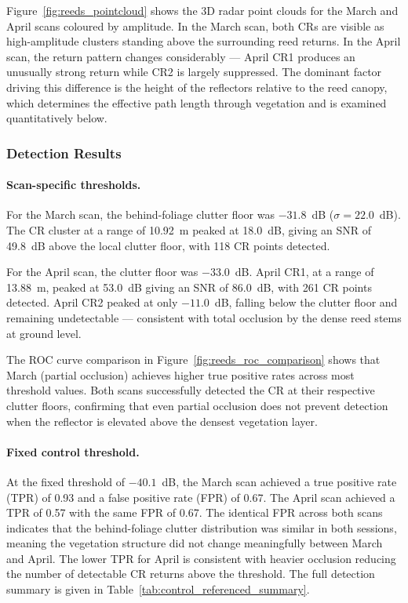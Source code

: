 Figure~\ref{fig:reeds_pointcloud} shows the 3D radar point clouds for the
March and April scans coloured by amplitude.
In the March scan, both CRs are visible as high-amplitude clusters standing
above the surrounding reed returns.
In the April scan, the return pattern changes considerably — April CR1
produces an unusually strong return while CR2 is largely suppressed.
The dominant factor driving this difference is the height of the reflectors
relative to the reed canopy, which determines the effective path length through
vegetation and is examined quantitatively below.

\subsubsection*{Detection Results}

\paragraph{Scan-specific thresholds.}
For the March scan, the behind-foliage clutter floor was $-31.8$~dB
($\sigma = 22.0$~dB).
The CR cluster at a range of 10.92~m peaked at 18.0~dB, giving an SNR of
49.8~dB above the local clutter floor, with 118 CR points detected.

For the April scan, the clutter floor was $-33.0$~dB.
April CR1, at a range of 13.88~m, peaked at 53.0~dB giving an SNR of
86.0~dB, with 261 CR points detected.
April CR2 peaked at only $-11.0$~dB, falling below the clutter floor and
remaining undetectable — consistent with total occlusion by the dense reed
stems at ground level.

The ROC curve comparison in Figure~\ref{fig:reeds_roc_comparison} shows that
March (partial occlusion) achieves higher true positive rates across most
threshold values.
Both scans successfully detected the CR at their respective clutter floors,
confirming that even partial occlusion does not prevent detection when the
reflector is elevated above the densest vegetation layer.

\paragraph{Fixed control threshold.}
At the fixed threshold of $-40.1$~dB, the March scan achieved a true positive
rate (TPR) of 0.93 and a false positive rate (FPR) of 0.67.
The April scan achieved a TPR of 0.57 with the same FPR of 0.67.
The identical FPR across both scans indicates that the behind-foliage clutter
distribution was similar in both sessions, meaning the vegetation structure
did not change meaningfully between March and April.
The lower TPR for April is consistent with heavier occlusion reducing the
number of detectable CR returns above the threshold.
The full detection summary is given in Table~\ref{tab:control_referenced_summary}.

